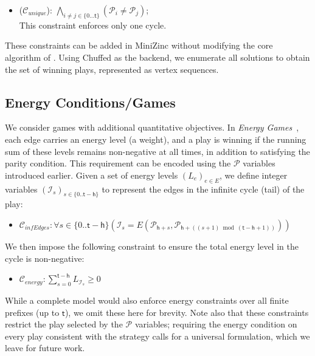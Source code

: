 \documentclass[a4paper,fleqn]{cas-sc}
\begin{document}
\begin{itemize}
\item ($\mathcal{C}_{\textit{unique}}$): 
$\bigwedge_{i \neq j \in \{0 \dots \mathsf{t}\}} (\mathcal{P}_i \neq \mathcal{P}_j)$; \\
This constraint enforces only one cycle.
\end{itemize} 

These constraints can be added in MiniZinc without modifying the core algorithm of \noc. Using Chuffed as the backend, we enumerate all solutions to obtain the set of winning plays, represented as vertex sequences. 

\subsection{Energy Conditions/Games}

We consider games with additional quantitative objectives. In \textit{Energy Games}~\citep{ChatterjeeD12}, each edge carries an energy level (a weight), and a play is winning if the running sum of these levels remains non-negative at all times, in addition to satisfying the parity condition.
%
This requirement can be encoded using the $\mathcal{P}$ variables introduced earlier. Given a set of energy levels $(L_e)_{e \in E}$, we define integer variables $(\mathcal{I}_s)_{s \in \{0..\mathsf{t} - \mathsf{h}\}}$ to represent the edges in the infinite cycle (tail) of the play:

\begin{itemize}
    \item $\mathcal{C}_{\textit{infEdges}} : \forall s \in \{0..\mathsf{t} - \mathsf{h}\} (\mathcal{I}_s = E(\mathcal{P}_{\mathsf{h}+s}, \mathcal{P}_{\mathsf{h}+((s+1) \bmod (\mathsf{t}-\mathsf{h}+1))}))$
\end{itemize}

We then impose the following constraint to ensure the total energy level in the cycle is non-negative:

\begin{itemize}
    \item $\mathcal{C}_{\textit{energy}} : \sum_{s=0}^{\mathsf{t}-\mathsf{h}} L_{\mathcal{I}_s} \geq 0$
\end{itemize}

While a complete model would also enforce energy constraints over all finite prefixes (up to $\mathsf{t}$), we omit these here for brevity. Note also that these constraints restrict the play selected by the $\mathcal{P}$ variables; requiring the energy condition on every play consistent with the strategy calls for a universal formulation, which we leave for future work. 
\end{document}
